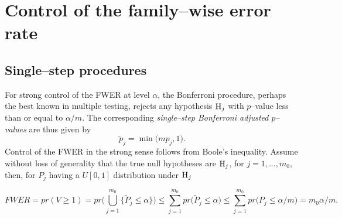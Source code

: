 \documentclass[11pt]{article}
\begin{document}

\section{Control of the family--wise error rate}\label{sFWER}

\subsection{Single--step procedures}

For strong control of the FWER at level $\alpha$, the Bonferroni
procedure, perhaps the best known in multiple testing, rejects any
hypothesis ${\rm H}_j$ with $p$--value less than or equal to $\alpha/m$. The corresponding {\it single--step
  Bonferroni adjusted $p$--values} are thus given by 
\begin{equation}\label{ebs}
\tilde{p}_j = \min \bigl( mp_j,1 \bigr).
\end{equation}
Control of the FWER in the strong sense follows from Boole's
inequality. Assume without loss of generality that the true null
hypotheses are ${\rm H}_j$, for $j=1,\ldots,m_0$, then, for  $P_j$
having a $U[0,1]$ distribution under ${\rm H}_j$


$$ FWER = pr(V \geq 1) = pr\bigl (\bigcup_{j=1}^{m_0} \{ \tilde{P}_j
\leq \alpha \} \bigr) \leq \sum_{j=1}^{m_0} pr\bigl (\tilde{P}_j \leq
\alpha \bigr) \leq  \sum_{j=1}^{m_0} pr\bigl (P_j \leq \alpha/m \bigr) = m_0 \alpha/m.$$
\end{document}
